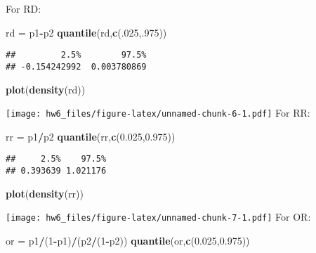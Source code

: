 \documentclass[]{article}
\newenvironment{Shaded}{\begin{snugshade}}{\end{snugshade}}
\newcommand{\KeywordTok}[1]{\textcolor[rgb]{0.13,0.29,0.53}{\textbf{#1}}}
\newcommand{\DecValTok}[1]{\textcolor[rgb]{0.00,0.00,0.81}{#1}}
\newcommand{\FloatTok}[1]{\textcolor[rgb]{0.00,0.00,0.81}{#1}}
\newcommand{\StringTok}[1]{\textcolor[rgb]{0.31,0.60,0.02}{#1}}
\newcommand{\OperatorTok}[1]{\textcolor[rgb]{0.81,0.36,0.00}{\textbf{#1}}}
\newcommand{\NormalTok}[1]{#1}
\begin{document}
For RD:

\begin{Shaded}
\begin{Highlighting}[]
\NormalTok{rd =}\StringTok{ }\NormalTok{p1}\OperatorTok{-}\NormalTok{p2}
\KeywordTok{quantile}\NormalTok{(rd,}\KeywordTok{c}\NormalTok{(.}\DecValTok{025}\NormalTok{,.}\DecValTok{975}\NormalTok{))}
\end{Highlighting}
\end{Shaded}

\begin{verbatim}
##         2.5%        97.5% 
## -0.154242992  0.003780869
\end{verbatim}

\begin{Shaded}
\begin{Highlighting}[]
\KeywordTok{plot}\NormalTok{(}\KeywordTok{density}\NormalTok{(rd))}
\end{Highlighting}
\end{Shaded}

\texttt{[image: hw6\_files/figure-latex/unnamed-chunk-6-1.pdf]} For RR:

\begin{Shaded}
\begin{Highlighting}[]
\NormalTok{rr =}\StringTok{ }\NormalTok{p1}\OperatorTok{/}\NormalTok{p2}
\KeywordTok{quantile}\NormalTok{(rr,}\KeywordTok{c}\NormalTok{(}\FloatTok{0.025}\NormalTok{,}\FloatTok{0.975}\NormalTok{))}
\end{Highlighting}
\end{Shaded}

\begin{verbatim}
##     2.5%    97.5% 
## 0.393639 1.021176
\end{verbatim}

\begin{Shaded}
\begin{Highlighting}[]
\KeywordTok{plot}\NormalTok{(}\KeywordTok{density}\NormalTok{(rr))}
\end{Highlighting}
\end{Shaded}

\texttt{[image: hw6\_files/figure-latex/unnamed-chunk-7-1.pdf]} For OR:

\begin{Shaded}
\begin{Highlighting}[]
\NormalTok{or =}\StringTok{ }\NormalTok{p1}\OperatorTok{/}\NormalTok{(}\DecValTok{1}\OperatorTok{-}\NormalTok{p1)}\OperatorTok{/}\NormalTok{(p2}\OperatorTok{/}\NormalTok{(}\DecValTok{1}\OperatorTok{-}\NormalTok{p2))}
\KeywordTok{quantile}\NormalTok{(or,}\KeywordTok{c}\NormalTok{(}\FloatTok{0.025}\NormalTok{,}\FloatTok{0.975}\NormalTok{))}
\end{Highlighting}
\end{Shaded}
\end{document}
